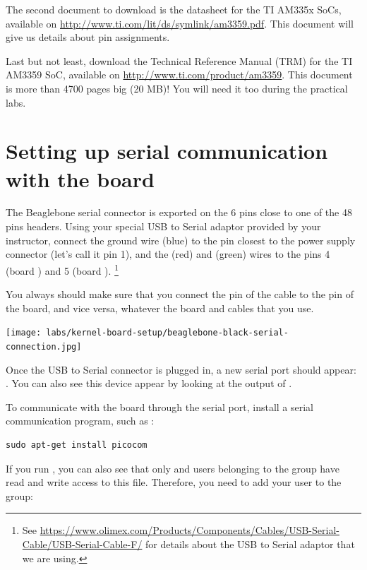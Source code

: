 The second document to download is the datasheet for the 
TI AM335x SoCs, available on
\url{http://www.ti.com/lit/ds/symlink/am3359.pdf}. This document will
give us details about pin assignments.

Last but not least, download the Technical Reference Manual (TRM) for
the TI AM3359 SoC, available on \url{http://www.ti.com/product/am3359}.
This document is more than 4700 pages big (20 MB)! You will need it
too during the practical labs. 

\section{Setting up serial communication with the board}

The Beaglebone serial connector is exported on the 6 pins close to one
of the 48 pins headers. Using your special USB to Serial adaptor provided
by your instructor, connect the ground wire (blue) to the pin closest
to the power supply connector (let's call it pin 1), and the  (red)
and  (green) wires to the pins 4 (board ) and
5 (board ). \footnote{See
\url{https://www.olimex.com/Products/Components/Cables/USB-Serial-Cable/USB-Serial-Cable-F/}
for details about the USB to Serial adaptor that we are using.} 

You always should make sure that you connect the  pin of the cable
to the  pin of the board, and vice versa, whatever the board and
cables that you use.

\begin{center}
\texttt{[image: labs/kernel-board-setup/beaglebone-black-serial-connection.jpg]}
\end{center}

Once the USB to Serial connector is plugged in, a new serial port
should appear: .  You can also see this device
appear by looking at the output of .

To communicate with the board through the serial port, install a
serial communication program, such as :

\begin{verbatim}
sudo apt-get install picocom
\end{verbatim}

If you run , you can also see that only
 and users belonging to the  group have
read and write access to this file. Therefore, you need to add your user
to the  group:

